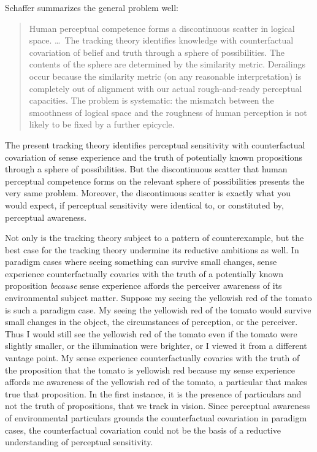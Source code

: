 \documentclass[12pt]{article}
\begin{document}
Schaffer summarizes the general problem well:
\begin{quote}
    Human perceptual competence forms a discontinuous scatter in logical space. \ldots\ The tracking theory identifies knowledge with counterfactual covariation of belief and truth through a sphere of possibilities. The contents of the sphere are determined by the similarity metric. Derailings occur because the similarity metric (on any reasonable interpretation) is completely out of alignment with our actual rough-and-ready perceptual capacities. The problem is systematic: the mismatch between the smoothness of logical space and the roughness of human perception is not likely to be fixed by a further epicycle. \citep[42]{Schaffer:2003vn}
\end{quote}
The present tracking theory identifies perceptual sensitivity with counterfactual covariation of sense experience and the truth of potentially known propositions through a sphere of possibilities. But the discontinuous scatter that human perceptual competence forms on the relevant sphere of possibilities presents the very same problem. Moreover, the discontinuous scatter is exactly what you would expect, if perceptual sensitivity were identical to, or constituted by, perceptual awareness. 

Not only is the tracking theory subject to a pattern of counterexample, but the best case for the tracking theory undermine its reductive ambitions as well. In paradigm cases where seeing something can survive small changes, sense experience counterfactually covaries with the truth of a potentially known proposition \emph{because} sense experience affords the perceiver awareness of its environmental subject matter. Suppose my seeing the yellowish red of the tomato is such a paradigm case. My seeing the yellowish red of the tomato would survive small changes in the object, the circumstances of perception, or the perceiver. Thus I would still see the yellowish red of the tomato even if the tomato were slightly smaller, or the illumination were brighter, or I viewed it from a different vantage point. My sense experience counterfactually covaries with the truth of the proposition that the tomato is yellowish red because my sense experience affords me awareness of the yellowish red of the tomato, a particular that makes true that proposition. In the first instance, it is the presence of particulars and not the truth of propositions, that we track in vision. Since perceptual awareness of environmental particulars grounds the counterfactual covariation in paradigm cases, the counterfactual covariation could not be the basis of a reductive understanding of perceptual sensitivity.
\end{document}

